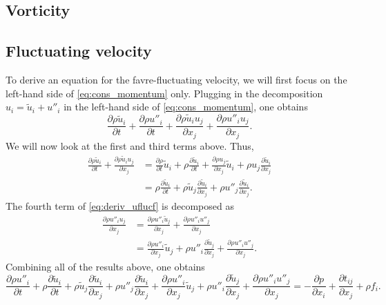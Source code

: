 \documentclass[oneside,a4paper,11pt]{report}
\newcommand{\uavgf}{\widetilde{u}}
\newcommand{\uflucf}{u''}
\begin{document}
\subsection{Vorticity}

\subsection{Fluctuating velocity}

To derive an equation for the favre-fluctuating velocity, we will first focus on the left-hand side of \cref{eq:cons_momentum} only. Plugging in the decomposition $u_i = \uavgf_i + \uflucf_i$ in the left-hand side of \cref{eq:cons_momentum}, one obtains
\begin{equation}
\label{eq:deriv_uflucf}
    \frac{\partial \rho \uavgf_i}{\partial t}  + \frac{\partial \rho \uflucf_i}{\partial t} + \frac{ \partial \rho \uavgf_i u_j}{\partial x_j} + \frac{\partial \rho \uflucf_i u_j}{\partial x_j}.
\end{equation}
We will now look at the first and third terms above. Thus,
\begin{align}
    \frac{\partial \rho \uavgf_i}{\partial t} + \frac{ \partial \rho \uavgf_i u_j}{\partial x_j} &= \frac{\partial \rho}{\partial t} \uavgf_i + \rho \frac{\partial \uavgf_i}{\partial t} + \frac{\partial \rho u_j}{\partial x_j} \uavgf_i + \rho u_j \frac{\partial \uavgf_i}{\partial x_j} \nonumber \\
    &= \rho \frac{\partial \uavgf_i}{\partial t} + \rho \uavgf_j \frac{\partial \uavgf_i}{\partial x_j} + \rho \uflucf_j \frac{\partial \uavgf_i}{\partial x_j}.
\end{align}
The fourth term of \cref{eq:deriv_uflucf} is decomposed as
\begin{align}
    \frac{\partial \rho \uflucf_i u_j}{\partial x_j} &= \frac{\partial \rho \uflucf_i \uavgf_j}{\partial x_j} + \frac{\partial \rho \uflucf_i \uflucf_j}{\partial x_j} \nonumber \\
    &= \frac{\partial \rho \uflucf_i}{\partial x_j} \uavgf_j + \rho \uflucf_i \frac{\partial \uavgf_j}{\partial x_j} + \frac{\partial \rho \uflucf_i \uflucf_j}{\partial x_j}.
\end{align}
Combining all of the results above, one obtains
\begin{equation}
\label{eq:vel_fluc_favre}
    \frac{\partial \rho \uflucf_i}{\partial t} + \rho \frac{\partial \uavgf_i}{\partial t} + \rho \uavgf_j \frac{\partial \uavgf_i}{\partial x_j} + \rho \uflucf_j \frac{\partial \uavgf_i}{\partial x_j} + \frac{\partial \rho \uflucf_i}{\partial x_j} \uavgf_j + \rho \uflucf_i \frac{\partial \uavgf_j}{\partial x_j} + \frac{\partial \rho \uflucf_i \uflucf_j}{\partial x_j} = -\frac{\partial p}{\partial x_i} + \frac{\partial t_{ij}}{\partial x_j} + \rho f_i.
\end{equation}
\end{document}
